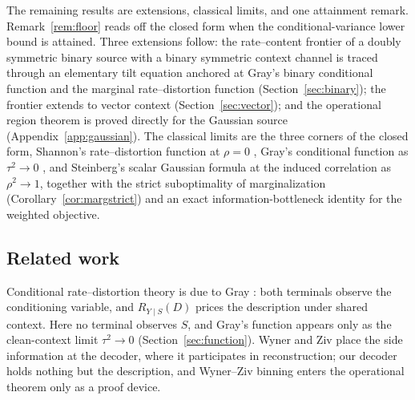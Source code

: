 \documentclass[11pt,onecolumn]{IEEEtran}
\begin{document}
The remaining results are extensions, classical limits, and one
attainment remark. Remark~\ref{rem:floor} reads off the closed form when
the conditional-variance lower bound is attained. Three extensions
follow: the rate--content frontier of a doubly symmetric binary source
with a binary symmetric context channel is traced through an elementary
tilt equation
anchored at Gray's binary conditional function and the marginal
rate--distortion function (Section~\ref{sec:binary}); the frontier
extends to vector context (Section~\ref{sec:vector}); and the operational
region theorem is proved directly for the Gaussian source
(Appendix~\ref{app:gaussian}). The classical limits are the three
corners of the closed form, Shannon's rate--distortion function
at $\rho=0$ \cite{shannon1959}, Gray's conditional function as
$\tau^2\to0$ \cite{gray1973}, and Steinberg's scalar Gaussian formula at
the induced correlation as $\rho^2\to1$, together with the strict
suboptimality of marginalization (Corollary~\ref{cor:margstrict}) and an
exact information-bottleneck identity for the weighted objective.

\subsection*{Related work}

Conditional rate--distortion theory is due to Gray
\cite{gray1972tr,gray1973}: both terminals observe the conditioning
variable, and $R_{Y\mid S}(D)$ prices the description under shared
context. Here no terminal observes $S$, and Gray's function appears only
as the clean-context limit $\tau^2\to0$ (Section~\ref{sec:function}).
Wyner and Ziv \cite{wynerziv1976} place the side information at the
decoder, where it participates in reconstruction; our decoder holds
nothing but the description, and Wyner--Ziv binning enters the
operational theorem only as a proof device.
\end{document}
